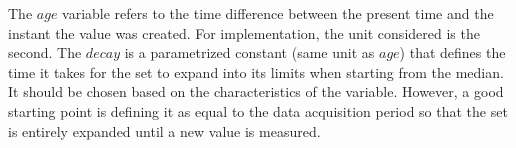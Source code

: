The $age$ variable refers to the time difference between the present time and the instant the value was created. For implementation, the unit considered is the second. The $decay$ is a parametrized constant (same unit as $age$) that defines the time it takes for the set to expand into its limits when starting from the median. It should be chosen based on the characteristics of the variable. However, a good starting point is defining it as equal to the data acquisition period so that the set is entirely expanded until a new value is measured.

\begin{figure}[h!]
    \begin{floatrow}
\end{floatrow}
\end{figure}
